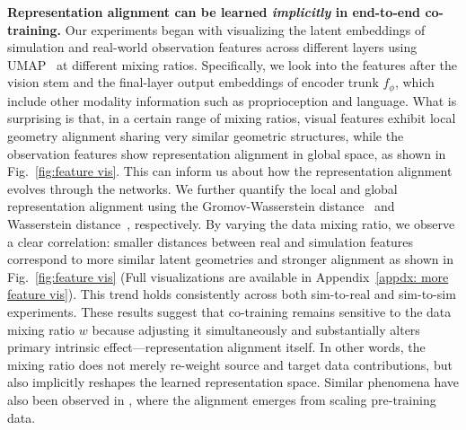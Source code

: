 \textbf{Representation alignment can be learned \textit{implicitly} in end-to-end co-training.}
Our experiments began with visualizing the latent embeddings of simulation and real-world observation features across different layers using UMAP~\cite{mcinnes2018umap} at different mixing ratios.
Specifically, we look into the features after the vision stem and the final-layer output embeddings of encoder trunk $f_\phi$, which include other modality information such as proprioception and language.
What is surprising is that, in a certain range of mixing ratios, visual features exhibit local geometry alignment sharing very similar geometric structures, while the observation features show representation alignment in global space, as shown in Fig.~\ref{fig:feature vis}.
This can inform us about how the representation alignment evolves through the networks.
We further quantify the local and global representation alignment using the Gromov-Wasserstein distance~\cite{memoli2011gromov} and Wasserstein distance~\cite{ruschendorf1985wasserstein}, respectively.
By varying the data mixing ratio, we observe a clear correlation: smaller distances between real and simulation features correspond to more similar latent geometries and stronger alignment as shown in Fig.~\ref{fig:feature vis} (Full visualizations are available in Appendix~\ref{appdx: more feature vis}).
This trend holds consistently across both sim-to-real and sim-to-sim experiments. These results suggest that co-training remains sensitive to the data mixing ratio $w$ because adjusting it simultaneously and substantially alters primary intrinsic effect—representation alignment itself. In other words, the mixing ratio does not merely re-weight source and target data contributions, but also implicitly reshapes the learned representation space. Similar phenomena have also been observed in \citet{kareer2025emergence}, where the alignment emerges from scaling pre-training data.


